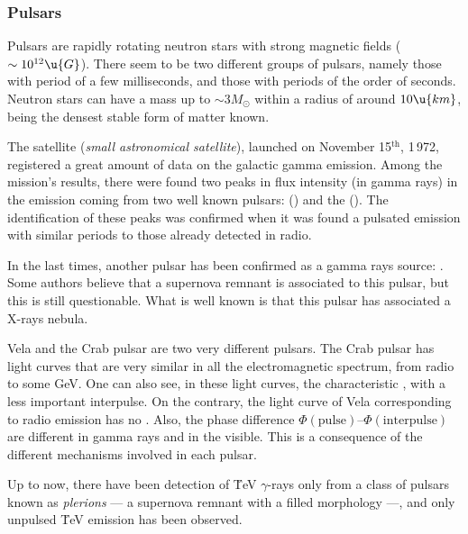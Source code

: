 \dopplerboostfig

\subsubsection{Pulsars}
\label{sec:pulsars}

Pulsars are rapidly rotating neutron stars with strong magnetic fields
($\sim 10^{12}\u{G}$). There seem to be two different groups of pulsars,
namely those with period of a few milliseconds, and those with periods
of the order of seconds.  Neutron stars can have a mass up to $\sim 3
M_\odot$ within a radius of around $10\u{km}$, being the densest stable
form of matter known.

\pulsarschfig
%
The satellite  (\emph{small astronomical satellite}),
launched on November 15$^{\mathrm{th}}$, 1\,972, registered a great
amount of data on the galactic gamma emission. Among the mission's
results, there were found two peaks in flux intensity (in gamma rays)
in the emission coming from two well known pulsars: 
() and the  (). The
identification of these peaks was confirmed when it was found a
pulsated emission with similar periods to those already detected in
radio.

In the last times, another pulsar has been confirmed as a gamma rays
source: . Some authors believe that a supernova
remnant is associated to this pulsar, but this is still questionable.
What is well known is that this pulsar has associated a X-rays nebula.

Vela and the Crab pulsar are two very different pulsars. The Crab
pulsar has light curves that are very similar in all the
electromagnetic spectrum, from radio to some GeV. One can also see, in
these light curves, the characteristic , with a less
important interpulse. On the contrary, the light curve of Vela
corresponding to radio emission has no . Also, the phase
difference $\Phi(\mathrm{pulse})$--$\Phi(\mathrm{interpulse})$ are different
in gamma rays and in the visible. This is a consequence of the
different mechanisms involved in each pulsar.

Up to now, there have been detection of \u{TeV} $\gamma$-rays only from a
class of pulsars known as \emph{plerions} --- a supernova remnant with
a filled morphology ---, and only unpulsed \u{TeV} emission has been
observed.

